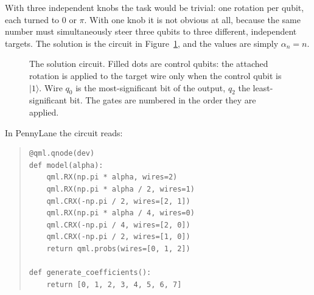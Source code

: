 \documentclass[11pt,a4paper]{article}
\newcommand{\ket}[1]{\lvert #1 \rangle}
\newcommand{\RX}{R_X}
\theoremstyle{plain}
\theoremstyle{definition}
\theoremstyle{remark}
\begin{document}
With three independent knobs the task would be trivial: one rotation per qubit, each turned to
$0$ or $\pi$. With one knob it is not obvious at all, because the same number must simultaneously
steer three qubits to three different, independent targets. The solution is the circuit in
Figure~\ref{fig:circuit}, and the values are simply $\alpha_n = n$.

\begin{figure}[ht]
\centering
{}
\caption{The solution circuit. Filled dots are control qubits: the attached rotation is applied
to the target wire only when the control qubit is $\ket{1}$. Wire $q_0$ is the most-significant
bit of the output, $q_2$ the least-significant bit. The gates are numbered in the order they are
applied.}
\label{fig:circuit}
\end{figure}

In PennyLane the circuit reads:
\begin{quote}\small
\begin{verbatim}
@qml.qnode(dev)
def model(alpha):
    qml.RX(np.pi * alpha, wires=2)
    qml.RX(np.pi * alpha / 2, wires=1)
    qml.CRX(-np.pi / 2, wires=[2, 1])
    qml.RX(np.pi * alpha / 4, wires=0)
    qml.CRX(-np.pi / 4, wires=[2, 0])
    qml.CRX(-np.pi / 2, wires=[1, 0])
    return qml.probs(wires=[0, 1, 2])

def generate_coefficients():
    return [0, 1, 2, 3, 4, 5, 6, 7]
\end{verbatim}
\end{quote}
\end{document}
